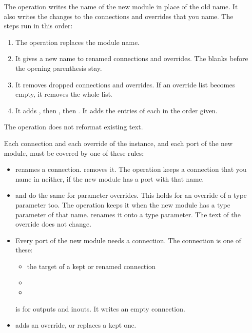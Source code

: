 \begin{entry}{}
\item[Writes] The operation writes the name of the new module in place of the old name.
  It also writes the changes to the connections and overrides that you name. The steps run
  in this order:
  \begin{enumerate}
  \item The operation replaces the module name.
  \item It gives a new name to renamed connections and overrides. The blanks before the
    opening parenthesis stay.
  \item It removes dropped connections and overrides. If an override list becomes empty,
    it removes the whole list.
  \item It adds , then , then . It adds
    the entries of each in the order given.
  \end{enumerate}
  The operation does not reformat existing text.
\item[Rules] Each connection and each override of the instance, and each port
  of the new module, must be covered by one of these rules:
  \begin{itemize}
  \item {} renames a connection. 
    removes it. The operation keeps a connection that you name in neither, if the new
    module has a port with that name.
  \item {} and  do the same for parameter overrides.
    This holds for an override of a type parameter too. The operation keeps it when the
    new module has a type parameter of that name.  renames it onto a type
    parameter. The text of the override does not change.
  \item Every port of the new module needs a connection. The connection is one of these:
    \begin{itemize}
    \item the target of a kept or renamed connection
    \item {}
    \item {}
    \end{itemize}
     is for outputs and inouts. It writes an empty connection.
  \item {} adds an override, or replaces a kept one.

\end{itemize}
\end{entry}
